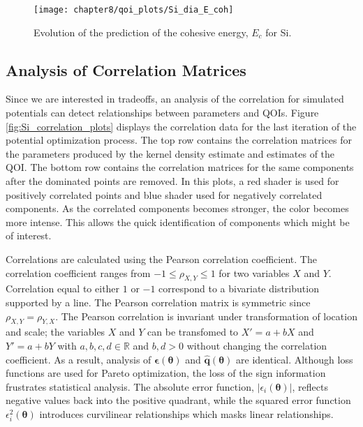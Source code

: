 \begin{figure}
	\centering
	\texttt{[image: chapter8/qoi\_plots/Si\_dia\_E\_coh]}
	\caption{Evolution of the prediction of the cohesive energy, $E_c$ for Si.}
	\label{fig:Si_qoi_E_coh}
\end{figure}

\subsection{Analysis of Correlation Matrices}

Since we are interested in tradeoffs, an analysis of the correlation for simulated potentials can detect relationships between parameters and QOIs.
Figure \ref{fig:Si_correlation_plots} displays the correlation data for the last iteration of the potential optimization process.
The top row contains the correlation matrices for the parameters produced by the kernel density estimate and estimates of the QOI.
The bottom row contains the correlation matrices for the same components after the dominated points are removed.
In this plots, a red shader is used for positively correlated points and blue shader used for negatively correlated components.  As the correlated components becomes stronger, the color becomes more intense.  This allows the quick identification of components which might be of interest.

Correlations are calculated using the Pearson correlation coefficient.\cite{devore2012_probability}
The correlation coefficient ranges from $-1 \leq \rho_{X,Y} \leq 1$ for two variables $X$ and $Y$.  Correlation equal to either $1$ or $-1$ correspond to a bivariate distribution supported by a line.
The Pearson correlation matrix is symmetric since $\rho_{X,Y} = \rho_{Y,X}$.
The Pearson correlation is invariant under transformation of location and scale; the variables $X$  and $Y$ can be transfomed to $X'=a+bX$ and $Y'=a+bY$ with $a,b,c,d \in \mathbb{R}$ and $b,d > 0$ without changing the correlation coefficient.  As a result, analysis of $\bm{\epsilon}(\bm{\theta})$ and $\hat{\bm{q}}(\bm{\theta})$ are identical.
Although loss functions are used for Pareto optimization, the loss of the sign information frustrates statistical analysis.  The absolute error function, $|\epsilon_i(\bm{\theta})|$, reflects negative values back into the positive quadrant, while the squared error function $\epsilon_i^2(\bm{\theta})$ introduces curvilinear relationships which masks linear relationships.

